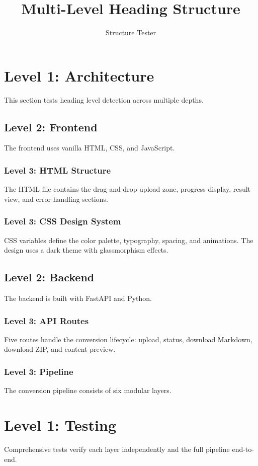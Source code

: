 \documentclass[12pt]{article}
\title{Multi-Level Heading Structure}
\author{Structure Tester}
\begin{document}
\maketitle

\section{Level 1: Architecture}
This section tests heading level detection across multiple depths.

\subsection{Level 2: Frontend}
The frontend uses vanilla HTML, CSS, and JavaScript.

\subsubsection{Level 3: HTML Structure}
The HTML file contains the drag-and-drop upload zone, progress display,
result view, and error handling sections.

\subsubsection{Level 3: CSS Design System}
CSS variables define the color palette, typography, spacing, and animations.
The design uses a dark theme with glassmorphism effects.

\subsection{Level 2: Backend}
The backend is built with FastAPI and Python.

\subsubsection{Level 3: API Routes}
Five routes handle the conversion lifecycle: upload, status, download Markdown,
download ZIP, and content preview.

\subsubsection{Level 3: Pipeline}
The conversion pipeline consists of six modular layers.

\section{Level 1: Testing}
Comprehensive tests verify each layer independently and the full pipeline
end-to-end.
\end{document}
